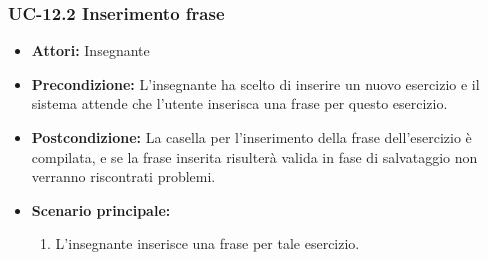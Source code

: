 \subsubsection{UC-12.2 Inserimento frase}
\begin{itemize}
\item \textbf{Attori: }Insegnante

\item \textbf{Precondizione: }L'insegnante ha scelto di inserire un nuovo esercizio e il sistema attende che l'utente inserisca una frase per questo esercizio.
\item \textbf{Postcondizione: }La casella per l'inserimento della frase dell'esercizio è compilata, e se la frase inserita risulterà valida in fase di salvataggio non verranno riscontrati problemi.
\item \textbf{Scenario principale: }
		\begin{enumerate}
		\item L'insegnante inserisce una frase per tale esercizio.
		\end{enumerate}
\end{itemize}

